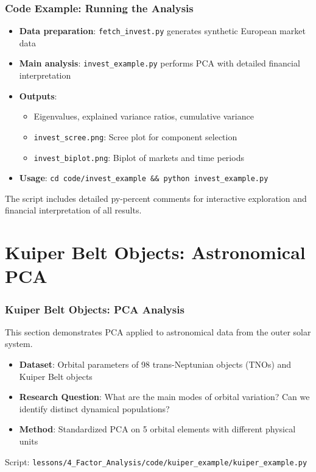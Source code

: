 \documentclass[aspectratio=169]{beamer}
\begin{document}
\begin{frame}
    \frametitle{Code Example: Running the Analysis}
    \begin{itemize}
        \item \textbf{Data preparation}: \texttt{fetch\_invest.py} generates synthetic European market data \pause
        \item \textbf{Main analysis}: \texttt{invest\_example.py} performs PCA with detailed financial interpretation \pause
        \item \textbf{Outputs}: 
              \begin{itemize}
                  \item Eigenvalues, explained variance ratios, cumulative variance \pause
                  \item \texttt{invest\_scree.png}: Scree plot for component selection \pause
                  \item \texttt{invest\_biplot.png}: Biplot of markets and time periods \pause
              \end{itemize}
        \item \textbf{Usage}: \texttt{cd code/invest\_example \&\& python invest\_example.py} \pause
    \end{itemize}
    \vspace{6pt}
    The script includes detailed py-percent comments for interactive exploration and financial interpretation of all results.
\end{frame}

\section{Kuiper Belt Objects: Astronomical PCA}

\begin{frame}
    \frametitle{Kuiper Belt Objects: PCA Analysis}
    This section demonstrates PCA applied to astronomical data from the outer solar system.
    \begin{itemize}
        \item \textbf{Dataset}: Orbital parameters of 98 trans-Neptunian objects (TNOs) and Kuiper Belt objects \pause
        \item \textbf{Research Question}: What are the main modes of orbital variation? Can we identify distinct dynamical populations? \pause
        \item \textbf{Method}: Standardized PCA on 5 orbital elements with different physical units \pause
    \end{itemize}
    \vspace{6pt}
    Script: \texttt{lessons/4\_Factor\_Analysis/code/kuiper\_example/kuiper\_example.py}
\end{frame}
\end{document}
